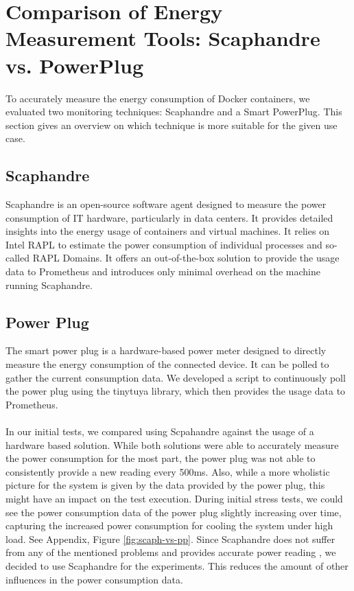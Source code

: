 \documentclass[conference]{IEEEtran}
\begin{document}
\section{Comparison of Energy Measurement Tools: Scaphandre vs. PowerPlug}
To accurately measure the energy consumption of Docker containers, we evaluated two monitoring techniques: Scaphandre and a Smart PowerPlug. This section gives an overview on which technique is more suitable for the given use case.

\subsection{Scaphandre}
Scaphandre is an open-source software agent designed to measure the power consumption of IT hardware, particularly in data centers. It provides detailed insights into the energy usage of containers and virtual machines. It relies on Intel RAPL to estimate the power consumption of individual processes and so-called RAPL Domains. It offers an out-of-the-box solution to provide the usage data to Prometheus and introduces only minimal overhead on the machine running Scaphandre.

\subsection{Power Plug}
The smart power plug is a hardware-based power meter designed to directly measure the energy consumption of the connected device. It can be polled to gather the current consumption data. We developed a script to continuously poll the power plug using the tinytuya\cite{jasonacox/tinytuya} library, which then provides the usage data to Prometheus.
\\
\\
In our initial tests, we compared using Scpahandre against the usage of a hardware based solution. While both solutions were able to accurately measure the power consumption for the most part, the power plug was not able to consistently provide a new reading every 500ms. Also, while a more wholistic picture for the system is given by the data provided by the power plug, this might have an impact on the test execution. During initial stress tests, we could see the power consumption data of the power plug slightly increasing over time, capturing the increased power consumption for cooling the system under high load. See Appendix, Figure \ref{fig:scaph-vs-pp}. Since Scaphandre does not suffer from any of the mentioned problems and provides accurate power reading \cite{kahnRapl}, we decided to use Scaphandre for the experiments. This reduces the amount of other influences in the power consumption data.
\end{document}
